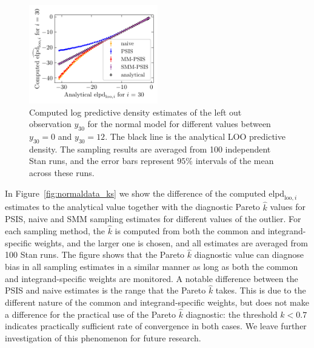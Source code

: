 \documentclass[12pt]{article}
\begin{document}
\begin{figure}[h]
\centering
\includegraphics[width=0.5\textwidth]{figs/normaldata_1.pdf}
%
\caption{Computed log predictive density estimates of the left out observation $y_{30}$ for the normal model
for different values between $y_{30} = 0$ and $y_{30} = 12$.
The black line is the analytical LOO predictive density. The sampling results are averaged from 100 independent Stan runs, and the error bars represent $95 \%$
intervals of the mean across these runs.} \label{fig:toynormal}
\end{figure}









In Figure~\ref{fig:normaldata_ks} we show the difference of the computed
$\text{elpd}_{\text{loo},i}$ estimates to the analytical
value together with the diagnostic Pareto $\hat{k}$ values for PSIS, naive and SMM sampling estimates for different values of the outlier. For each sampling method, the
$\hat{k}$ is computed from both the common and integrand-specific weights, and
the larger one is chosen, and
all estimates are averaged from 100 Stan runs.
The figure shows that the Pareto $\hat{k}$ diagnostic value
can diagnose bias in all sampling estimates in a similar manner as long
as both the common and integrand-specific weights are monitored.
A notable difference between the PSIS and naive estimates is the range
that the Pareto $\hat{k}$ takes. This is due to the different nature of the common
and integrand-specific weights, but does not make a difference for
the practical use of the Pareto $\hat{k}$ diagnostic: the threshold
$\hat{k} < 0.7$ indicates practically sufficient rate of convergence in both cases.
We leave further investigation of this phenomenon for future
research.
\end{document}

